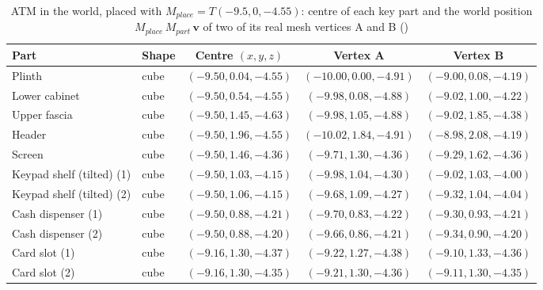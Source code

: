 \begin{table}[H]\centering\footnotesize
\caption{ATM in the world, placed with $M_{place}=T(-9.5, 0, -4.55)$: centre of each key part and the world position $M_{place}\,M_{part}\,\mathbf{v}$ of two of its real mesh vertices A and B ()}\label{tab:world_atm}
\begin{tabular}{@{}l l c c c@{}}
\toprule
Part & Shape & Centre $(x,y,z)$ & Vertex A & Vertex B \\
\midrule
Plinth & cube & $(-9.50, 0.04, -4.55)$ & $(-10.00, 0.00, -4.91)$ & $(-9.00, 0.08, -4.19)$ \\
Lower cabinet & cube & $(-9.50, 0.54, -4.55)$ & $(-9.98, 0.08, -4.88)$ & $(-9.02, 1.00, -4.22)$ \\
Upper fascia & cube & $(-9.50, 1.45, -4.63)$ & $(-9.98, 1.05, -4.88)$ & $(-9.02, 1.85, -4.38)$ \\
Header & cube & $(-9.50, 1.96, -4.55)$ & $(-10.02, 1.84, -4.91)$ & $(-8.98, 2.08, -4.19)$ \\
Screen & cube & $(-9.50, 1.46, -4.36)$ & $(-9.71, 1.30, -4.36)$ & $(-9.29, 1.62, -4.36)$ \\
Keypad shelf (tilted) (1) & cube & $(-9.50, 1.03, -4.15)$ & $(-9.98, 1.04, -4.30)$ & $(-9.02, 1.03, -4.00)$ \\
Keypad shelf (tilted) (2) & cube & $(-9.50, 1.06, -4.15)$ & $(-9.68, 1.09, -4.27)$ & $(-9.32, 1.04, -4.04)$ \\
Cash dispenser (1) & cube & $(-9.50, 0.88, -4.21)$ & $(-9.70, 0.83, -4.22)$ & $(-9.30, 0.93, -4.21)$ \\
Cash dispenser (2) & cube & $(-9.50, 0.88, -4.20)$ & $(-9.66, 0.86, -4.21)$ & $(-9.34, 0.90, -4.20)$ \\
Card slot (1) & cube & $(-9.16, 1.30, -4.37)$ & $(-9.22, 1.27, -4.38)$ & $(-9.10, 1.33, -4.36)$ \\
Card slot (2) & cube & $(-9.16, 1.30, -4.35)$ & $(-9.21, 1.30, -4.36)$ & $(-9.11, 1.30, -4.35)$ \\
\bottomrule
\end{tabular}
\end{table}
